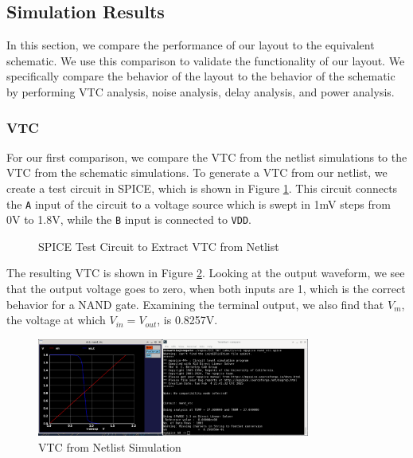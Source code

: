\documentclass{article}
\begin{document}
	\subsection{Simulation Results}
	
	In this section, we compare the performance of our layout to the equivalent schematic. We use this comparison to validate the functionality of our layout. We specifically compare the behavior of the layout to the behavior of the schematic by performing VTC analysis, noise analysis, delay analysis, and power analysis.
	
	\subsubsection{VTC}
	
	For our first comparison, we compare the VTC from the netlist simulations to the VTC from the schematic simulations. To generate a VTC from our netlist, we create a test circuit in SPICE, which is shown in Figure \ref{fig::nand_vtc_test_circuit}. This circuit connects the \texttt{A} input of the circuit to a voltage source which is swept in 1mV steps from 0V to 1.8V, while the \texttt{B} input is connected to \texttt{VDD}.
	
	\begin{figure}[H]
		
		\caption{SPICE Test Circuit to Extract VTC from Netlist}
		\label{fig::nand_vtc_test_circuit}
	\end{figure}
	
	The resulting VTC is shown in Figure \ref{fig::nand_vtc}. Looking at the output waveform, we see that the output voltage goes to zero, when both inputs are 1, which is the correct behavior for a NAND gate. Examining the terminal output, we also find that $V_m$, the voltage at which $V_{in} = V_{out}$, is 0.8257V.
	
	\begin{figure}[H]
		\centerline{\includegraphics[width=0.8\textwidth]{nand_vtc.png}}
		\caption{VTC from Netlist Simulation}
		\label{fig::nand_vtc}
	\end{figure}
	
\end{document}
